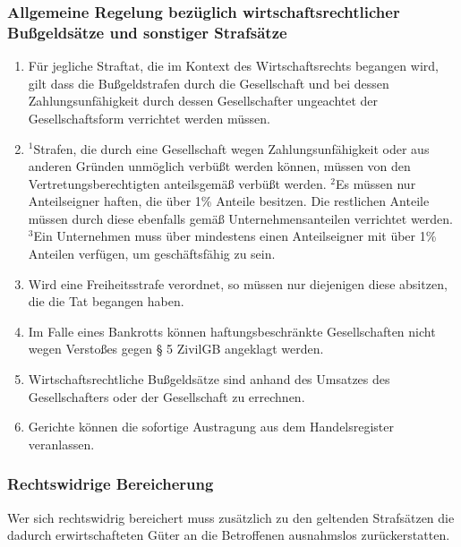 \documentclass{article}
\begin{document}
\subsubsection{Allgemeine Regelung bezüglich wirtschaftsrechtlicher Bußgeldsätze und sonstiger Strafsätze}
\begin{enumerate}[(1)]
    \item Für jegliche Straftat, die im Kontext des Wirtschaftsrechts begangen wird, gilt dass die Bußgeldstrafen durch die Gesellschaft und bei dessen Zahlungsunfähigkeit durch dessen Gesellschafter ungeachtet der Gesellschaftsform verrichtet werden müssen.
    \item ${^1}$Strafen, die durch eine Gesellschaft wegen Zahlungsunfähigkeit oder aus anderen Gründen unmöglich verbüßt werden können, müssen von den Vertretungsberechtigten anteilsgemäß verbüßt werden. ${^2}$Es müssen nur Anteilseigner haften, die über 1\% Anteile besitzen. Die restlichen Anteile müssen durch diese ebenfalls gemäß Unternehmensanteilen verrichtet werden. ${^3}$Ein Unternehmen muss über mindestens einen Anteilseigner mit über 1\% Anteilen verfügen, um geschäftsfähig zu sein.
    \item Wird eine Freiheitsstrafe verordnet, so müssen nur diejenigen diese absitzen, die die Tat begangen haben.
    \item Im Falle eines Bankrotts können haftungsbeschränkte Gesellschaften nicht wegen Verstoßes gegen § 5 ZivilGB angeklagt werden.
    \item Wirtschaftsrechtliche Bußgeldsätze sind anhand des Umsatzes des Gesellschafters oder der Gesellschaft zu errechnen.
    \item Gerichte können die sofortige Austragung aus dem Handelsregister veranlassen.
\end{enumerate}

\subsubsection{Rechtswidrige Bereicherung}
Wer sich rechtswidrig bereichert muss zusätzlich zu den geltenden Strafsätzen die dadurch erwirtschafteten Güter an die Betroffenen ausnahmslos zurückerstatten.
\end{document}
